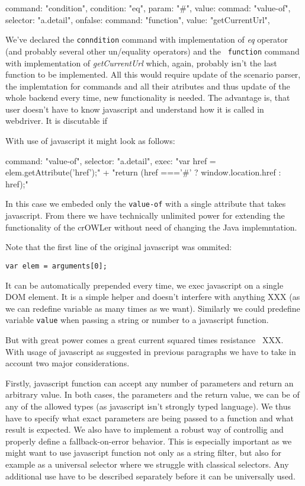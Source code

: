 \begtt
{
  command: "condition", 
  condition: "eq", 
  param: "#", 
  value: {
    commad: "value-of", 
    selector: "a.detail", 
  }
  onfalse: {
    command: "function", 
    value: "getCurrentUrl", 
  }
}
\endtt

We've declared the {\tt conndition} command with implementation of {\em eq}
operator (and probably several other un/equality operators) and the {\tt
function} command with implementation of {\em getCurrentUrl} which, again,
probably isn't the last function to be implemented. All this would require
update of the scenario parser, the implemtation for commands and all their
atributes and thus update of the whole backend every time, new functionality is
needed. The advantage is, that user doesn't have to know javascript and
understand how it is called in webdriver. It is discutable if 

With use of javascript it might look as follows: 

\begtt
{
  command: "value-of", 
  selector: "a.detail", 
  exec: "var href = elem.getAttribute('href');" +
        "return (href ==='#' ? window.location.href : href);"
}
\endtt

In this case we embeded only the {\tt value-of} with a single attribute that
takes javascript. From there we have technically unlimited power for extending
the functionality of the crOWLer without need of changing the Java implemntation. 

Note that the first line of the original javascript was ommited: 

{\tt var elem = arguments[0];} 

It can be automatically prepended every time, we exec javascript on a single
DOM element. It is a simple helper and doesn't interfere with anything XXX (as
we can redefine variable as many times as we want). Similarly we could
predefine variable {\tt value} when passing a string or number to a javascript
function. 

But with great power comes a great current squared times
resistance~ XXX. With usage of javascript as
suggested in previous paragraphs we have to take in account two major
considerations. 

Firstly, javascript function can accept any number of parameters and return an
arbitrary value. In both cases, the parameters and the return value, we can be
of any of the allowed types (as javascript isn't strongly typed language). We
thus have to specify what exact parameters are being passed to a function and
what result is expected. We also have to implement a robust way of controllig
and properly define a fallback-on-error behavior. This is especially important
as we might want to use javascript function not only as a string filter, but also
for example as a universal selector where we struggle with classical selectors. 
Any additional use have to be described separately before it can be universally
used. 

